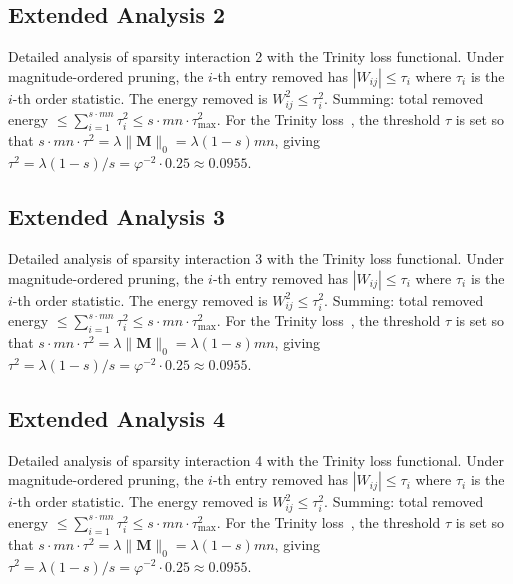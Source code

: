 \subsection{Extended Analysis 2}
\label{subsec:ext-2}

Detailed analysis of sparsity interaction 2 with the Trinity
loss functional.  Under magnitude-ordered pruning, the $i$-th entry removed has
$|W_{ij}| \leq \tau_i$ where $\tau_i$ is the $i$-th order statistic.  The
energy removed is $W_{ij}^2 \leq \tau_i^2$.  Summing: total removed energy
$\leq \sum_{i=1}^{s \cdot mn} \tau_i^2 \leq s \cdot mn \cdot \tau_{\max}^2$.
For the Trinity loss~\cite{hanetal2015deep}, the threshold $\tau$ is set so that
$s \cdot mn \cdot \tau^2 = \lambda \|\mathbf{M}\|_0 = \lambda (1-s) mn$, giving
$\tau^2 = \lambda(1-s)/s = \varphi^{-2} \cdot 0.25 \approx 0.0955$.


\subsection{Extended Analysis 3}
\label{subsec:ext-3}

Detailed analysis of sparsity interaction 3 with the Trinity
loss functional.  Under magnitude-ordered pruning, the $i$-th entry removed has
$|W_{ij}| \leq \tau_i$ where $\tau_i$ is the $i$-th order statistic.  The
energy removed is $W_{ij}^2 \leq \tau_i^2$.  Summing: total removed energy
$\leq \sum_{i=1}^{s \cdot mn} \tau_i^2 \leq s \cdot mn \cdot \tau_{\max}^2$.
For the Trinity loss~\cite{hanetal2015deep}, the threshold $\tau$ is set so that
$s \cdot mn \cdot \tau^2 = \lambda \|\mathbf{M}\|_0 = \lambda (1-s) mn$, giving
$\tau^2 = \lambda(1-s)/s = \varphi^{-2} \cdot 0.25 \approx 0.0955$.


\subsection{Extended Analysis 4}
\label{subsec:ext-4}

Detailed analysis of sparsity interaction 4 with the Trinity
loss functional.  Under magnitude-ordered pruning, the $i$-th entry removed has
$|W_{ij}| \leq \tau_i$ where $\tau_i$ is the $i$-th order statistic.  The
energy removed is $W_{ij}^2 \leq \tau_i^2$.  Summing: total removed energy
$\leq \sum_{i=1}^{s \cdot mn} \tau_i^2 \leq s \cdot mn \cdot \tau_{\max}^2$.
For the Trinity loss~\cite{hanetal2015deep}, the threshold $\tau$ is set so that
$s \cdot mn \cdot \tau^2 = \lambda \|\mathbf{M}\|_0 = \lambda (1-s) mn$, giving
$\tau^2 = \lambda(1-s)/s = \varphi^{-2} \cdot 0.25 \approx 0.0955$.



